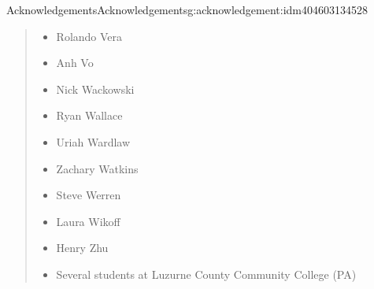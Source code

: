 \documentclass[twoside,10pt,]{book}
\numberwithin{equation}{section}
\begin{document}
\begin{acknowledgement}{Acknowledgements}{}{Acknowledgements}{}{}{g:acknowledgement:idm404603134528}
\begin{quote}
\begin{multicols}{2}
\begin{itemize}[label=\textbullet]
\item{}Rolando Vera%
\item{}Anh Vo%
\item{}Nick Wackowski%
\item{}Ryan Wallace%
\item{}Uriah Wardlaw%
\item{}Zachary Watkins%
\item{}Steve Werren%
\item{}Laura Wikoff%
\item{}Henry Zhu%
\item{}Several students at Luzurne County Community College (PA)%
\end{itemize}
\end{multicols}
%
\end{quote}
\end{acknowledgement}
%
%
\typeout{************************************************}
\typeout{************************************************}
%
\end{document}
